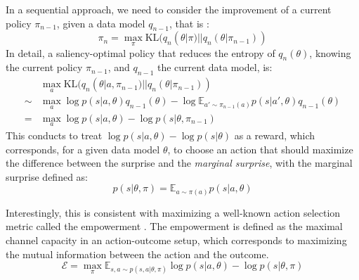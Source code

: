 \documentclass[10pt,letterpaper]{article}
\begin{document}
In a sequential approach, we need to consider the improvement of a current policy $\pi_{n-1}$, given a data model $q_{n-1}$, that is :
$$\pi_n = \max_{\pi}\text{KL}(q_n(\theta|\pi)||q_n(\theta|\pi_{n-1}))$$
In detail, a saliency-optimal policy that reduces the entropy of $q_n(\theta)$, knowing the current policy $\pi_{n-1}$, and $q_{n-1}$ the current data model, is:
\begin{align}
&\max_a \text{KL}(q_n(\theta|a, \pi_{n-1})||q_n(\theta|\pi_{n-1}))\nonumber\\
\sim &\max_a \log p(s|a,\theta) q_{n-1}(\theta) - \log \mathbb{E}_{a'\sim\pi_{n-1}(a)} p(s|a',\theta) q_{n-1}(\theta)\nonumber\\
= &\max_a \log p(s|a,\theta) - \log p(s|\theta, \pi_{n-1})\nonumber
\end{align}
This conducts to treat $\log p(s|a,\theta) - \log p(s|\theta)$ as a reward, which corresponds, for a given data model $\theta$, to choose an action that should maximize the difference between the surprise and the \emph{marginal surprise}, with the marginal surprise defined as:
$$ p(s|\theta,\pi) = \mathbb{E}_{a\sim\pi(a)} p(s|a,\theta)$$

Interestingly, this is consistent with maximizing a well-known action selection metric called the empowerment \cite{klyubin2005empowerment}.  The empowerment is defined as the maximal channel capacity in an action-outcome setup, which corresponds to maximizing the mutual information between the action and the outcome. 
$$\mathcal{E} = \max_\pi \mathbb{E}_{s,a\sim p(s,a|\theta,\pi)} \log p(s|a,\theta) - \log p(s|\theta, \pi)$$
\end{document}
